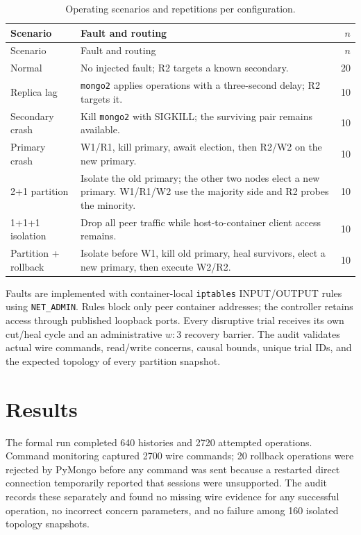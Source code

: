 \documentclass[11pt,a4paper]{article}
\begin{document}
\begin{longtable}{@{}p{35mm}p{104mm}r@{}}
\caption{Operating scenarios and repetitions per configuration.}\\
\toprule
Scenario & Fault and routing & $n$\\
\midrule
\endfirsthead
\toprule Scenario & Fault and routing & $n$\\ \midrule
\endhead
Normal & No injected fault; R2 targets a known secondary. & 20\\
Replica lag & \texttt{mongo2} applies operations with a three-second delay; R2 targets it. & 10\\
Secondary crash & Kill \texttt{mongo2} with SIGKILL; the surviving pair remains available. & 10\\
Primary crash & W1/R1, kill primary, await election, then R2/W2 on the new primary. & 10\\
2+1 partition & Isolate the old primary; the other two nodes elect a new primary. W1/R1/W2 use the majority side and R2 probes the minority. & 10\\
1+1+1 isolation & Drop all peer traffic while host-to-container client access remains. & 10\\
Partition + rollback & Isolate before W1, kill old primary, heal survivors, elect a new primary, then execute W2/R2. & 10\\
\bottomrule
\end{longtable}

Faults are implemented with container-local \texttt{iptables} INPUT/OUTPUT rules using
\texttt{NET\_ADMIN}. Rules block only peer container addresses; the controller retains access
through published loopback ports. Every disruptive trial receives its own cut/heal cycle and
an administrative $w:3$ recovery barrier. The audit validates actual wire commands,
read/write concerns, causal bounds, unique trial IDs, and the expected topology of every
partition snapshot.

\section{Results}

The formal run completed 640 histories and 2720 attempted operations. Command monitoring
captured 2700 wire commands; 20 rollback operations were rejected by PyMongo before any
command was sent because a restarted direct connection temporarily reported that sessions
were unsupported. The audit records these separately and found no missing wire evidence for
any successful operation, no incorrect concern parameters, and no failure among 160 isolated
topology snapshots.
\end{document}

